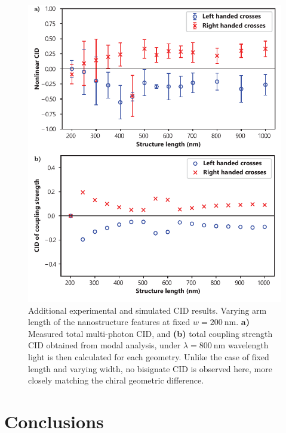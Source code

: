 \begin{figure}[htb!]	
    \centering	
    \includegraphics[scale=1]{./figures/results/EnantiomorphingChiralCrosses/d200data.pdf}
    \caption{\label{fig:results:EnantiomorphingChiralCrosses:d200data}
    Additional experimental and simulated CID results. Varying arm length of the nanostructure features at fixed $w=\SI{200}{\nano\m}$. \textbf{a)} Measured total multi-photon CID, and \textbf{(b)} total coupling strength CID obtained from modal analysis, under $\lambda=\SI{800}{\nano\m}$ wavelength light is then calculated for each geometry. Unlike the case of fixed length and varying width, no bisignate CID is observed here, more closely matching the chiral geometric difference.}
\end{figure}

\section{Conclusions}\label{sec:results:EnantiomorphingChiralCrosses:conclusions}

